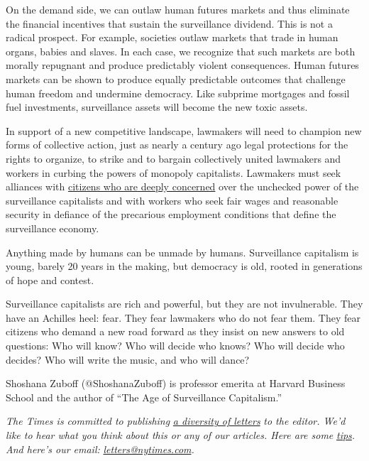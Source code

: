 On the demand side, we can outlaw human futures markets and thus
eliminate the financial incentives that sustain the surveillance
dividend. This is not a radical prospect. For example, societies outlaw
markets that trade in human organs, babies and slaves. In each case, we
recognize that such markets are both morally repugnant and produce
predictably violent consequences. Human futures markets can be shown to
produce equally predictable outcomes that challenge human freedom and
undermine democracy. Like subprime mortgages and fossil fuel
investments, surveillance assets will become the new toxic assets.

In support of a new competitive landscape, lawmakers will need to
champion new forms of collective action, just as nearly a century ago
legal protections for the rights to organize, to strike and to bargain
collectively united lawmakers and workers in curbing the powers of
monopoly capitalists. Lawmakers must seek alliances with
\href{https://www.citylab.com/life/2018/12/bianca-wylie-interview-toronto-quayside-protest-criticism/574477/}{citizens
who are deeply concerned} over the unchecked power of the surveillance
capitalists and with workers who seek fair wages and reasonable security
in defiance of the precarious employment conditions that define the
surveillance economy.

Anything made by humans can be unmade by humans. Surveillance capitalism
is young, barely 20 years in the making, but democracy is old, rooted in
generations of hope and contest.

Surveillance capitalists are rich and powerful, but they are not
invulnerable. They have an Achilles heel: fear. They fear lawmakers who
do not fear them. They fear citizens who demand a new road forward as
they insist on new answers to old questions: Who will know? Who will
decide who knows? Who will decide who decides? Who will write the music,
and who will dance?

Shoshana Zuboff (@ShoshanaZuboff) is professor emerita at Harvard
Business School and the author of ``The Age of Surveillance
Capitalism.''

\emph{The Times is committed to publishing}
\href{https://www.nytimes.com/2019/01/31/opinion/letters/letters-to-editor-new-york-times-women.html}{\emph{a
diversity of letters}} \emph{to the editor. We'd like to hear what you
think about this or any of our articles. Here are some}
\href{https://help.nytimes.com/hc/en-us/articles/115014925288-How-to-submit-a-letter-to-the-editor}{\emph{tips}}\emph{.
And here's our email:}
\href{mailto:letters@nytimes.com}{\emph{letters@nytimes.com}}\emph{.}

